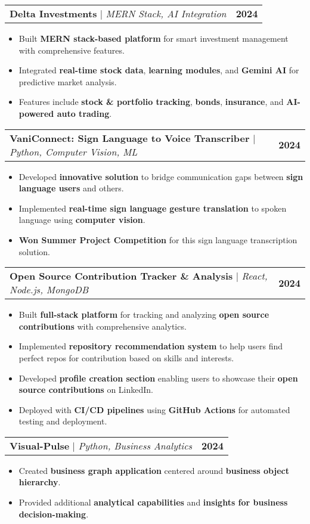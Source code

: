 \documentclass[letterpaper,11pt]{article}
\makeatletter
\newcommand{\resumeItem}[1]{
  \item\small{
    {#1 \vspace{-2pt}}
  }
}
\newcommand{\resumeProjectHeading}[2]{
    \item
    \begin{tabular*}{1.001\textwidth}{l@{\extracolsep{\fill}}r}
      \small#1 & \textbf{\small #2}\\
    \end{tabular*}\vspace{-7pt}
}
\newcommand{\resumeItemListStart}{\begin{itemize}}
\newcommand{\resumeItemListEnd}{\end{itemize}\vspace{-5pt}}
\makeatother
\begin{document}
      \resumeProjectHeading
          {\textbf{Delta Investments} $|$ \emph{MERN Stack, AI Integration}}{2024}
          \resumeItemListStart
            \resumeItem{Built \textbf{MERN stack-based platform} for smart investment management with comprehensive features.}
            \resumeItem{Integrated \textbf{real-time stock data}, \textbf{learning modules}, and \textbf{Gemini AI} for predictive market analysis.}
            \resumeItem{Features include \textbf{stock \& portfolio tracking}, \textbf{bonds}, \textbf{insurance}, and \textbf{AI-powered auto trading}.}
          \resumeItemListEnd
          \vspace{-13pt}

      \resumeProjectHeading
          {\textbf{VaniConnect: Sign Language to Voice Transcriber} $|$ \emph{Python, Computer Vision, ML}}{2024}
          \resumeItemListStart
            \resumeItem{Developed \textbf{innovative solution} to bridge communication gaps between \textbf{sign language users} and others.}
            \resumeItem{Implemented \textbf{real-time sign language gesture translation} to spoken language using \textbf{computer vision}.}
            \resumeItem{\textbf{Won Summer Project Competition} for this sign language transcription solution.}
          \resumeItemListEnd 
          \vspace{-13pt}

      \resumeProjectHeading
          {\textbf{Open Source Contribution Tracker \& Analysis} $|$ \emph{React, Node.js, MongoDB}}{2024}
          \resumeItemListStart
            \resumeItem{Built \textbf{full-stack platform} for tracking and analyzing \textbf{open source contributions} with comprehensive analytics.}
            \resumeItem{Implemented \textbf{repository recommendation system} to help users find perfect repos for contribution based on skills and interests.}
            \resumeItem{Developed \textbf{profile creation section} enabling users to showcase their \textbf{open source contributions} on LinkedIn.}
            \resumeItem{Deployed with \textbf{CI/CD pipelines} using \textbf{GitHub Actions} for automated testing and deployment.}
          \resumeItemListEnd
          \vspace{-13pt}

      \resumeProjectHeading
          {\textbf{Visual-Pulse} $|$ \emph{Python, Business Analytics}}{2024}
          \resumeItemListStart
            \resumeItem{Created \textbf{business graph application} centered around \textbf{business object hierarchy}.}
            \resumeItem{Provided additional \textbf{analytical capabilities} and \textbf{insights for business decision-making}.}
          \resumeItemListEnd 
          \vspace{-13pt}
\end{document}
